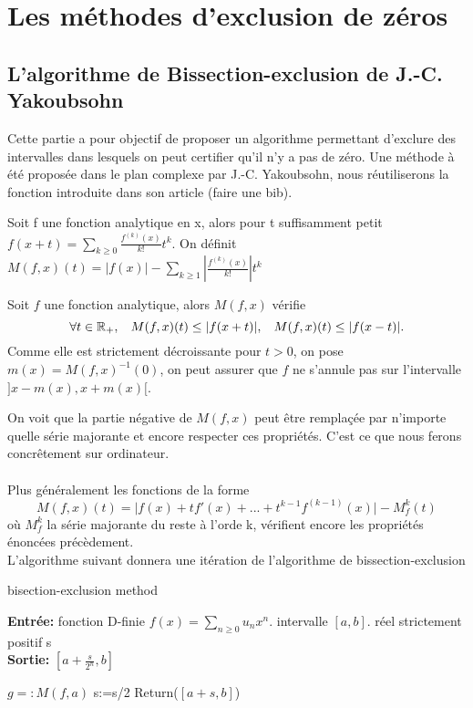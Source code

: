 \documentclass[a4paper,10.5pt]{article}
\begin{document}
	\section{Les méthodes d'exclusion de zéros}
	\subsection{L'algorithme de Bissection-exclusion de J.-C. Yakoubsohn}
	
	Cette partie a pour objectif de proposer un algorithme permettant d'exclure des intervalles dans lesquels on peut certifier qu'il n'y a pas de zéro. Une méthode à été proposée dans le plan complexe par J.-C. Yakoubsohn, nous réutiliserons la fonction introduite dans son article (faire une bib).
	
	\begin{definition}Soit f une fonction analytique en x, alors pour t suffisamment petit\\ $f(x+t)=\sum_{k\geq0} \frac{f^{(k)}(x)}{k!}t^{k}$. On définit $M(f,x)(t)=|f(x)|-\sum_{k\geq1}|\frac{f^{(k)}(x)}{k!}|t^{k}$
	\end{definition}
	\begin{proposition}
		Soit $f$ une fonction analytique, alors $M(f,x)$ vérifie 
		\[\forall t \in \mathbb{R}_+, \hspace{3mm} M(f,x)(t) \leq |f(x+t)|, \hspace{3mm} M(f,x)(t) \leq |f(x-t)|.\]
		 Comme elle est strictement décroissante pour $t>0$, on pose $m(x)=M(f,x)^{-1}(0)$, on peut assurer que $f$ ne s'annule pas sur l'intervalle $]x-m(x),x+m(x)[$.
	\end{proposition}
	\vspace{7mm}
	On voit que la partie négative de $M(f,x)$ peut être remplaçée par n'importe quelle série majorante et encore respecter ces propriétés. C'est ce que nous ferons concrêtement sur ordinateur.\\
	\\
	Plus généralement les fonctions de la forme \[M(f,x)(t)=\big|f(x)+tf'(x)+...+t^{k-1}f^{(k-1)}(x)\big|-M_f^{k}(t)\] où $M_f^{k}$ la série  majorante du reste à l'orde k, vérifient encore les propriétés énoncées précèdement.\\
	
	\noindent L'algorithme suivant donnera une itération de l'algorithme de bissection-exclusion 
	
	
	\begin{algorithm}
		\caption{bisection-exclusion method}
		
		\vspace{2mm}
		
		\textbf{Entrée:} fonction D-finie $f(x)=\sum_{n \geq 0} u_nx^{n}$. intervalle $[a,b]$. réel strictement positif s\\
		\textbf{Sortie:} $[a+\frac{s}{2^n},b]$
		
		\begin{algorithmic}[1]
			\STATE $g=:M(f,a)$
			\STATE s:=s/2
			\ENDWHILE
			\STATE Return($[a+s,b]$)
		\end{algorithmic}
		
	\end{algorithm}
	
\end{document}
